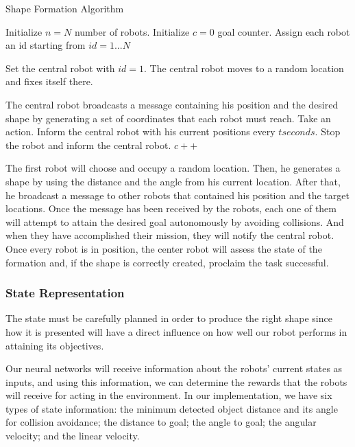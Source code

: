 \documentclass[12pt]{extarticle}
\begin{document}
\begin{algorithm}[H]
\caption{Shape Formation Algorithm}
\label{alg:ddpg}
\begin{algorithmic}[1]

\State Initialize $n=N$ number of robots.
\State Initialize $c=0$ goal counter.
\State Assign each robot an id starting from $id=1...N$

\State Set the central robot with $id=1$.
\State The central robot moves to a random location and fixes itself there.

\State The central robot broadcasts a message containing his position and the desired shape by generating a set of coordinates that each robot must reach.
\State Take an action.
\State Inform the central robot with his current positions every $t seconds$.
    \State Stop the robot and inform the central robot.
    \State $c++$ 

\EndIf 

\EndFor

\EndWhile

\end{algorithmic}
\end{algorithm}




The first robot will choose and occupy a random location. Then, he generates a shape by using the distance and the angle from his current location. After that, he broadcast a message to other robots that contained his position and the target locations. Once the message has been received by the robots, each one of them will attempt to attain the desired goal autonomously by avoiding collisions. And when they have accomplished their mission, they will notify the central robot. Once every robot is in position, the center robot will assess the state of the formation and, if the shape is correctly created, proclaim the task successful.




\subsubsection{State Representation}


The state must be carefully planned in order to produce the right shape since how it is presented will have a direct influence on how well our robot performs in attaining its objectives.



Our neural networks will receive information about the robots' current states as inputs, and using this information, we can determine the rewards that the robots will receive for acting in the environment.
In our implementation, we have six types of state information: the minimum detected object distance and its angle for collision avoidance; the distance to goal; the angle to goal; the angular velocity; and the linear velocity.
\end{document}
